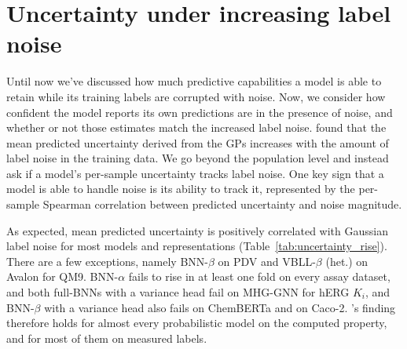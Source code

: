\section{Uncertainty under increasing label noise}\label{sec:uq}

Until now we've discussed how much predictive capabilities a model is able to retain while its training labels are corrupted with noise. Now, we consider how confident the model reports its own predictions are in the presence of noise, and whether or not those estimates match the increased label noise. \citet{Kolmar2021} found that the mean predicted uncertainty derived from the GPs increases with the amount of label noise in the training data. We go beyond the population level and instead ask if a model's per-sample uncertainty tracks label noise. One key sign that a model is able to handle noise is its ability to track it, represented by the per-sample Spearman correlation between predicted uncertainty and noise magnitude.

As expected, mean predicted uncertainty is positively correlated with Gaussian label noise for most models and representations (Table~\ref{tab:uncertainty_rise}). There are a few exceptions, namely BNN-$\beta$ on PDV and VBLL-$\beta$ (het.) on Avalon for QM9. BNN-$\alpha$ fails to rise in at least one fold on every assay dataset, and both full-BNNs with a variance head fail on MHG-GNN for hERG $K_i$, and BNN-$\beta$ with a variance head also fails on ChemBERTa and on Caco-2. \citet{Kolmar2021}'s finding therefore holds for almost every probabilistic model on the computed property, and for most of them on measured labels.

